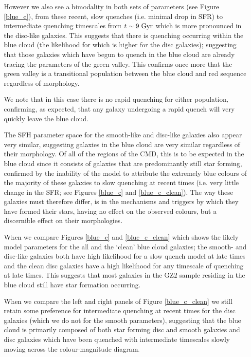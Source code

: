 \documentclass[useAMS,usenatbib]{mn2e}
\begin{document}
However we also see a bimodality in both sets of parameters (see Figure \ref{blue_c}), from these recent, slow quenches (i.e. minimal drop in SFR) to intermediate quenching timescales from $t\sim9~\rm{Gyr}$ which is more pronounced in the disc-like galaxies. This suggests that there is quenching occurring within the blue cloud (the likelihood for which is higher for the disc galaxies); suggesting that those galaxies which have begun to quench in the blue cloud are already tracing the parameters of the green valley. This confirms once more that the green valley is a transitional population between the blue cloud and red sequence regardless of morphology.

We note that in this case there is no rapid quenching for either population, confirming, as expected, that any galaxy undergoing a rapid quench will very quickly leave the blue cloud. 

The SFH parameter space for the smooth-like and disc-like galaxies also appear very similar, suggesting galaxies in the blue cloud are very similar regardless of their morphology. Of all of the regions of the CMD, this is to be expected in the blue cloud since it consists of galaxies that are predominantly still star forming, confirmed by the inability of the model to attribute the extremely blue colours of the majority of these galaxies to slow quenching at recent times (i.e. very little change in the SFR; see Figures \ref{blue_c} and \ref{blue_c_clean}). The way these galaxies must therefore differ, is in the mechanisms and triggers by which they have formed their stars, having no effect on the observed colours, but a discernible effect on their morphologies.

When we compare Figures \ref{blue_c} and \ref{blue_c_clean} which shows the likely model parameters for the all and the `clean' blue cloud galaxies; the smooth- and disc-like galaxies both have high likelihood for a slow quench model at late times and the clean disc galaxies have a high likelihood for any timescale of quenching at late times. This suggests that most galaxies in the GZ2 sample residing in the blue cloud still have star formation occurring. 

When we compare the left and right panels of Figure \ref{blue_c_clean} we still retain some preference for intermediate quenching at recent times for the disc galaxies (which we do not for the smooth parameters), suggesting that the blue cloud is primarily composed of both star forming disc and smooth galaxies and disc galaxies which have been quenched with intermediate timescales slowly moving across the colour-magnitude diagram.
\end{document}
